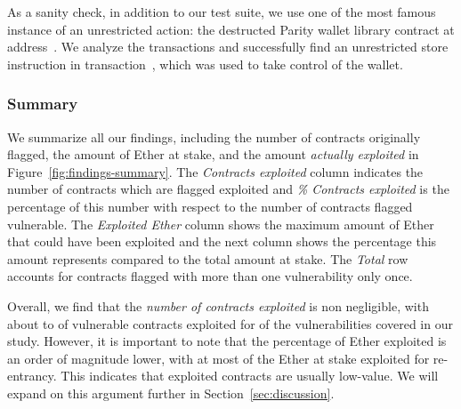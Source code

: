  As a sanity check, in addition to our test suite, we use one of the most famous instance of an unrestricted action: the destructed Parity wallet library contract at address~. We analyze the transactions and successfully find an unrestricted store instruction in transaction~, which was used to take control of the wallet.

\subsubsection{Summary}
We summarize all our findings, including the number of contracts originally flagged, the amount of Ether at stake, and the amount \emph{actually exploited} in Figure~\ref{fig:findings-summary}. The \emph{Contracts exploited} column indicates the number of contracts which are flagged exploited and \emph{\% Contracts exploited} is the percentage of this number with respect to the number of contracts flagged vulnerable. The \emph{Exploited Ether} column shows the maximum amount of Ether that could have been exploited and the next column shows the percentage this amount represents compared to the total amount at stake. The \emph{Total} row accounts for contracts flagged with more than one vulnerability only once.

Overall, we find that the \emph{number of contracts exploited} is non negligible, with about  to  of vulnerable contracts exploited for  of the \VulnTypesNum vulnerabilities covered in our study.
However, it is important to note that the percentage of Ether exploited is an order of magnitude lower, with at most  of the Ether at stake exploited for re-entrancy.
This indicates that exploited contracts are usually low-value.
We will expand on this argument further in Section~\ref{sec:discussion}.



